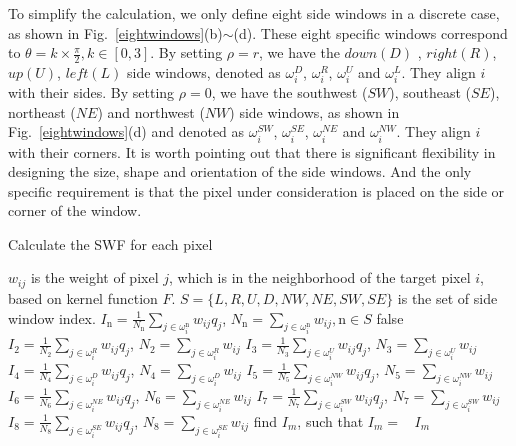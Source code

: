 \documentclass[10pt,twocolumn,letterpaper]{article}
\begin{document}
To simplify the calculation, we only define eight side windows in a discrete case, as shown in Fig.~\ref{eightwindows}(b)$\sim$(d). These eight specific windows correspond to $\theta=k\times\frac{\pi}{2}, k\in[0,3]$. By setting $\rho = r$, we have the $down (D)$ , $right (R)$, $up (U)$, $left (L)$ side windows, denoted as $\omega^{D}_i$, $\omega^{R}_i$, $\omega^{U}_i$ and $\omega^{L}_i$. They align $i$ with their sides. By setting $\rho = 0$, we have the southwest ($SW$), southeast ($SE$), northeast ($NE$) and northwest ($NW$) side windows, as shown in Fig.~\ref{eightwindows}(d) and denoted as $\omega^{SW}_i$, $\omega^{SE}_i$, $\omega^{NE}_i$ and $\omega^{NW}_i$. They align $i$ with their corners. It is worth pointing out that there is significant flexibility in designing the size, shape and orientation of the side windows. And the only specific requirement is that the pixel under consideration is placed on the side or corner of the window.
\begin{algorithm}[!htb]
	\caption{Calculate the SWF for each pixel} \label{algo_swf}
	\begin{algorithmic}[1]
		\REQUIRE $w_{ij}$ is the weight of pixel $j$, which is in the neighborhood of the target pixel $i$, based on kernel function $F$. $S = \{L, R, U, D, NW, NE, SW, SE\}$ is the set of side window index.
		\STATE $I_{\mathrm{{n}}} = \frac{1}{N_{\mathrm{{n}}}}\mathop{\sum}_{j\in\omega^{\mathrm{{n}}}_i}w_{ij}q_j$, $N_{\mathrm{{n}}} = \mathop{\sum}_{j\in\omega^{\mathrm{{n}}}_i}w_{ij}, \mathrm{{n}} \in S $
		\if false
		\STATE $I_2 = \frac{1}{N_2}\mathop{\sum}_{j\in\omega^{R}_i}w_{ij}q_j$, $N_2 = \mathop{\sum}_{j\in\omega^{R}_i}w_{ij}$
		\STATE $I_3 = \frac{1}{N_3}\mathop{\sum}_{j\in\omega^{U}_i}w_{ij}q_j$, $N_3 = \mathop{\sum}_{j\in\omega^{U}_i}w_{ij}$
		\STATE $I_4 = \frac{1}{N_4}\mathop{\sum}_{j\in\omega^{D}_i}w_{ij}q_j$, $N_4 = \mathop{\sum}_{j\in\omega^{D}_i}w_{ij}$
		\STATE $I_5 = \frac{1}{N_5}\mathop{\sum}_{j\in\omega^{NW}_i}w_{ij}q_j$, $N_5 = \mathop{\sum}_{j\in\omega^{NW}_i}w_{ij}$
		\STATE $I_6 = \frac{1}{N_6}\mathop{\sum}_{j\in\omega^{NE}_i}w_{ij}q_j$, $N_6 = \mathop{\sum}_{j\in\omega^{NE}_i}w_{ij}$
		\STATE $I_7 = \frac{1}{N_7}\mathop{\sum}_{j\in\omega^{SW}_i}w_{ij}q_j$, $N_7 = \mathop{\sum}_{j\in\omega^{SW}_i}w_{ij}$
		\STATE $I_8 = \frac{1}{N_8}\mathop{\sum}_{j\in\omega^{SE}_i}w_{ij}q_j$, $N_8 = \mathop{\sum}_{j\in\omega^{SE}_i}w_{ij}$
		\fi
		\STATE find $I_m$, such that $I_m = \mathop{\operatorname*{argmin}_{n \in S}{||q_i - I_n||_2^2}}$
		\ENSURE $I_m$
	\end{algorithmic}
\end{algorithm} 
\end{document}
